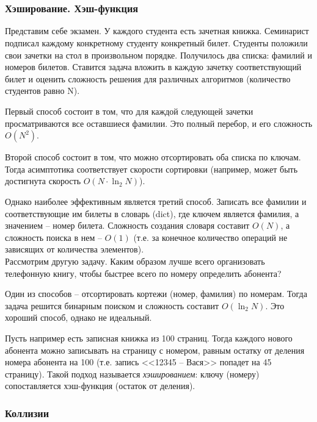 \chapter{}
%
\subsection*{Хэширование. Хэш-функция}

Представим себе экзамен. У каждого студента есть зачетная книжка. Семинарист подписал каждому конкретному студенту конкретный билет. Студенты положили свои зачетки на стол в произвольном порядке. Получилось два списка: фамилий и номеров билетов. Ставится задача вложить в каждую зачетку соответствующий билет и оценить сложность решения для различных алгоритмов (количество студентов равно N). 

Первый способ состоит в том, что для каждой следующей зачетки просматриваются все оставшиеся фамилии. Это полный перебор, и его сложность $O(N^2)$. 

Второй способ состоит в том, что можно отсортировать оба списка по ключам. Тогда асимптотика соответствует скорости сортировки (например, может быть достигнута скорость $O(N\cdot\ln_2{N})$).

Однако наиболее эффективным является третий способ. Записать все фамилии и соответствующие им билеты в словарь (dict), где ключем является фамилия, а значением -- номер билета. Сложность создания словаря составит $O(N)$, а сложность поиска в нем -- $O(1)$ (т.е. за конечное количество операций не зависящих от количества элементов).\\ 

Рассмотрим другую задачу. Каким образом лучше всего организовать телефонную книгу, чтобы быстрее всего по номеру определить абонента?

Один из способов -- отсортировать кортежи (номер, фамилия) по номерам. Тогда задача решится бинарным поиском и сложность составит $O(\ln_2{N})$. Это хороший способ, однако не идеальный.

Пусть например есть записная книжка из 100 страниц. Тогда каждого нового абонента можно записывать на страницу с номером, равным остатку от деления номера абонента на 100 (т.е. запись <<12345 -- Вася>> попадет на 45 страницу).
Такой подход называется \emph{хэшированием}: ключу (номеру) сопоставляется хэш-функция (остаток от деления). 
\subsection*{Коллизии}

